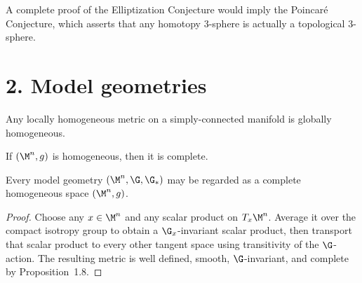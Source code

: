 \begin{remark}
\label{ch01-rem-poincare}

A complete proof of the Elliptization Conjecture would imply the Poincar\'e Conjecture, which asserts that any homotopy $3$-sphere is actually a topological $3$-sphere.
\end{remark}

\section*{2. Model geometries}

\begin{proposition}
\label{ch01-prop-singer}

Any locally homogeneous metric on a simply-connected manifold is globally homogeneous.
\end{proposition}

\begin{proposition}
\label{ch01-prop-homogeneous-complete}

If $(\M^n,g)$ is homogeneous, then it is complete.
\end{proposition}

\begin{lemma}
\label{ch01-lem-model-geometry-to-homogeneous-space}

Every model geometry $(\M^n,\G,\G_*)$ may be regarded as a complete homogeneous space $(\M^n,g)$.
\end{lemma}

\begin{proof}
\sketch Choose any $x\in \M^n$ and any scalar product on $T_x\M^n$. Average it over the compact isotropy group to obtain a $\G_x$-invariant scalar product, then transport that scalar product to every other tangent space using transitivity of the $\G$-action. The resulting metric is well defined, smooth, $\G$-invariant, and complete by Proposition~1.8.
\end{proof}

